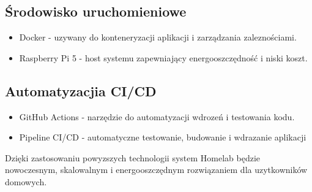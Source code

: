 \subsection{Środowisko uruchomieniowe}
\begin{itemize}
    \item Docker - uzywany do konteneryzacji aplikacji i zarządzania zaleznościami.
    \item Raspberry Pi 5 - host systemu zapewniający energooszczędność i niski koszt.
\end{itemize}
\subsection{Automatyzacjia CI/CD}
\begin{itemize}
    \item GitHub Actions - narzędzie do automatyzacji wdrozeń i testowania kodu.
    \item Pipeline CI/CD - automatyczne testowanie, budowanie i wdrazanie aplikacji
\end{itemize}

Dzięki zastosowaniu powyzszych technologii system Homelab będzie nowoczesnym, skalowalnym i energooszczędnym rozwiązaniem dla uzytkowników domowych.